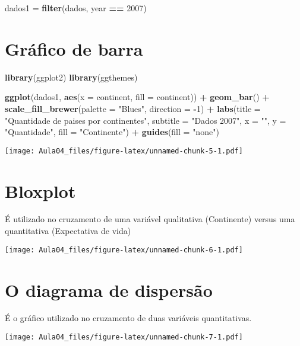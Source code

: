 \documentclass[
]{article}
\newenvironment{Shaded}{\begin{snugshade}}{\end{snugshade}}
\newcommand{\AttributeTok}[1]{\textcolor[rgb]{0.13,0.29,0.53}{#1}}
\newcommand{\DecValTok}[1]{\textcolor[rgb]{0.00,0.00,0.81}{#1}}
\newcommand{\FunctionTok}[1]{\textcolor[rgb]{0.13,0.29,0.53}{\textbf{#1}}}
\newcommand{\NormalTok}[1]{#1}
\newcommand{\OtherTok}[1]{\textcolor[rgb]{0.56,0.35,0.01}{#1}}
\newcommand{\SpecialCharTok}[1]{\textcolor[rgb]{0.81,0.36,0.00}{\textbf{#1}}}
\newcommand{\StringTok}[1]{\textcolor[rgb]{0.31,0.60,0.02}{#1}}
\begin{document}
\begin{Shaded}
\begin{Highlighting}[]
\NormalTok{dados1 }\OtherTok{=} \FunctionTok{filter}\NormalTok{(dados, year }\SpecialCharTok{==} \DecValTok{2007}\NormalTok{)}
\end{Highlighting}
\end{Shaded}

\section{Gráfico de barra}\label{gruxe1fico-de-barra}

\begin{Shaded}
\begin{Highlighting}[]
\FunctionTok{library}\NormalTok{(ggplot2)}
\FunctionTok{library}\NormalTok{(ggthemes)}


\FunctionTok{ggplot}\NormalTok{(dados1, }\FunctionTok{aes}\NormalTok{(}\AttributeTok{x =}\NormalTok{ continent, }\AttributeTok{fill =}\NormalTok{ continent)) }\SpecialCharTok{+} 
  \FunctionTok{geom\_bar}\NormalTok{() }\SpecialCharTok{+} 
  \FunctionTok{scale\_fill\_brewer}\NormalTok{(}\AttributeTok{palette =} \StringTok{"Blues"}\NormalTok{, }\AttributeTok{direction =} \SpecialCharTok{{-}}\DecValTok{1}\NormalTok{) }\SpecialCharTok{+}
  \FunctionTok{labs}\NormalTok{(}\AttributeTok{title =} \StringTok{"Quantidade de paises por continentes"}\NormalTok{,}
       \AttributeTok{subtitle =} \StringTok{"Dados 2007"}\NormalTok{,}
       \AttributeTok{x =} \StringTok{""}\NormalTok{,}
       \AttributeTok{y =} \StringTok{"Quantidade"}\NormalTok{,}
       \AttributeTok{fill =} \StringTok{"Continente"}\NormalTok{) }\SpecialCharTok{+}
  \FunctionTok{guides}\NormalTok{(}\AttributeTok{fill =} \StringTok{"none"}\NormalTok{) }
\end{Highlighting}
\end{Shaded}

\texttt{[image: Aula04\_files/figure-latex/unnamed-chunk-5-1.pdf]}

\section{Bloxplot}\label{bloxplot}

É utilizado no cruzamento de uma variável qualitativa (Continente)
versus uma quantitativa (Expectativa de vida)

\texttt{[image: Aula04\_files/figure-latex/unnamed-chunk-6-1.pdf]}

\section{O diagrama de dispersão}\label{o-diagrama-de-dispersuxe3o}

É o gráfico utilizado no cruzamento de duas variáveis quantitativas.

\texttt{[image: Aula04\_files/figure-latex/unnamed-chunk-7-1.pdf]}
\end{document}
